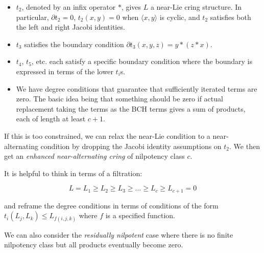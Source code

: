 \documentclass[10pt]{amsart}
\begin{document}
\begin{itemize}
\item $t_2$, denoted by an infix operator $*$, gives $L$ a near-Lie
  cring structure. In particular, $\partial t_2 = 0$, $t_2(x,y) = 0$
  when $\langle x,y \rangle$ is cyclic, and $t_2$ satisfies both the
  left and right Jacobi identities.
\item $t_3$ satisfies the boundary condition $\partial t_3(x,y,z) = y
  * (z * x)$.
\item $t_4$, $t_5$, etc. each satisfy a specific boundary condition
  where the boundary is expressed in terms of the lower $t_i$s.
\item We have degree conditions that guarantee that sufficiently
  iterated terms are zero. The basic idea being that something should
  be zero if actual replacement taking the terms as the BCH terms
  gives a sum of products, each of length at least $c + 1$.
\end{itemize}

If this is too constrained, we can relax the near-Lie condition to a
near-alternating condition by dropping the Jacobi identity assumptions
on $t_2$. We then get an {\em enhanced near-alternating cring} of
nilpotency class $c$.

It is helpful to think in terms of a filtration:

$$L = L_1 \ge L_2 \ge L_3 \ge \dots \ge L_c \ge L_{c+1} = 0$$

and reframe the degree conditions in terms of conditions of the form
$t_i(L_j,L_k) \le L_{f(i,j,k)}$ where $f$ is a specified function.

We can also consider the {\em residually nilpotent} case where there
is no finite nilpotency class but all products eventually become zero.
\end{document}
